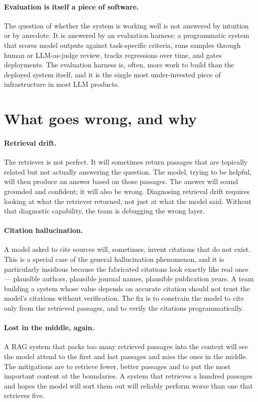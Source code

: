 \paragraph{Evaluation is itself a piece of software.} The
question of whether the system is working well is not
answered by intuition or by anecdote. It is answered by an
evaluation harness: a programmatic system that scores model
outputs against task-specific criteria, runs samples through
human or LLM-as-judge review, tracks regressions over time,
and gates deployments. The evaluation harness is, often, more
work to build than the deployed system itself, and it is the
single most under-invested piece of infrastructure in most
LLM products.

\section{What goes wrong, and why}

\paragraph{Retrieval drift.} The retriever is not perfect. It
will sometimes return passages that are topically related but
not actually answering the question. The model, trying to be
helpful, will then produce an answer based on those passages.
The answer will sound grounded and confident; it will also be
wrong. Diagnosing retrieval drift requires looking at what
the retriever returned, not just at what the model said.
Without that diagnostic capability, the team is debugging the
wrong layer.

\paragraph{Citation hallucination.} A model asked to cite
sources will, sometimes, invent citations that do not exist.
This is a special case of the general hallucination
phenomenon, and it is particularly insidious because the
fabricated citations look exactly like real ones --- plausible
authors, plausible journal names, plausible publication years.
A team building a system whose value depends on accurate
citation should not trust the model's citations without
verification. The fix is to constrain the model to cite only
from the retrieved passages, and to verify the citations
programmatically.

\paragraph{Lost in the middle, again.} A RAG system that
packs too many retrieved passages into the context will see
the model attend to the first and last passages and miss the
ones in the middle. The mitigations are to retrieve fewer,
better passages and to put the most important content at the
boundaries. A system that retrieves a hundred passages and
hopes the model will sort them out will reliably perform
worse than one that retrieves five.


